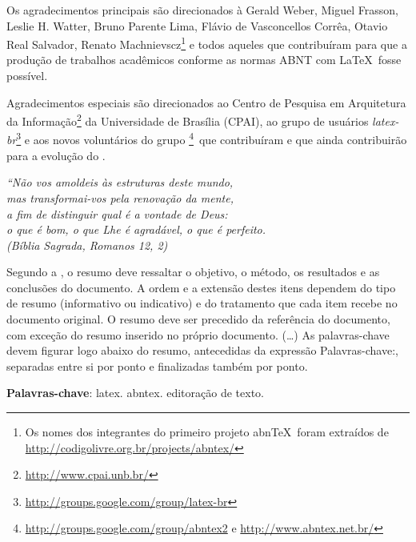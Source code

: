 \documentclass[
	12pt,				%
	openright,			%
	twoside,			%
	a4paper,			%
	english,			%
	french,				%
	spanish,			%
	brazil				%
	]{abntex2}
\begin{document}


\begin{agradecimentos}
Os agradecimentos principais são direcionados à Gerald Weber, Miguel Frasson,
Leslie H. Watter, Bruno Parente Lima, Flávio de Vasconcellos Corrêa, Otavio Real
Salvador, Renato Machnievscz\footnote{Os nomes dos integrantes do primeiro
projeto abn\TeX\ foram extraídos de
\url{http://codigolivre.org.br/projects/abntex/}} e todos aqueles que
contribuíram para que a produção de trabalhos acadêmicos conforme
as normas ABNT com \LaTeX\ fosse possível.

Agradecimentos especiais são direcionados ao Centro de Pesquisa em Arquitetura
da Informação\footnote{\url{http://www.cpai.unb.br/}} da Universidade de
Brasília (CPAI), ao grupo de usuários
\emph{latex-br}\footnote{\url{http://groups.google.com/group/latex-br}} e aos
novos voluntários do grupo
\emph{\abnTeX}\footnote{\url{http://groups.google.com/group/abntex2} e
\url{http://www.abntex.net.br/}}~que contribuíram e que ainda
contribuirão para a evolução do \abnTeX.

\end{agradecimentos}

\begin{epigrafe}
    \vspace*{\fill}
	\begin{flushright}
		\textit{``Não vos amoldeis às estruturas deste mundo, \\
		mas transformai-vos pela renovação da mente, \\
		a fim de distinguir qual é a vontade de Deus: \\
		o que é bom, o que Lhe é agradável, o que é perfeito.\\
		(Bíblia Sagrada, Romanos 12, 2)}
	\end{flushright}
\end{epigrafe}


\setlength{\absparsep}{18pt} %
\begin{resumo}
 Segundo a , o resumo deve ressaltar o
 objetivo, o método, os resultados e as conclusões do documento. A ordem e a extensão
 destes itens dependem do tipo de resumo (informativo ou indicativo) e do
 tratamento que cada item recebe no documento original. O resumo deve ser
 precedido da referência do documento, com exceção do resumo inserido no
 próprio documento. (\ldots) As palavras-chave devem figurar logo abaixo do
 resumo, antecedidas da expressão Palavras-chave:, separadas entre si por
 ponto e finalizadas também por ponto.

 \textbf{Palavras-chave}: latex. abntex. editoração de texto.
\end{resumo}
\end{document}
